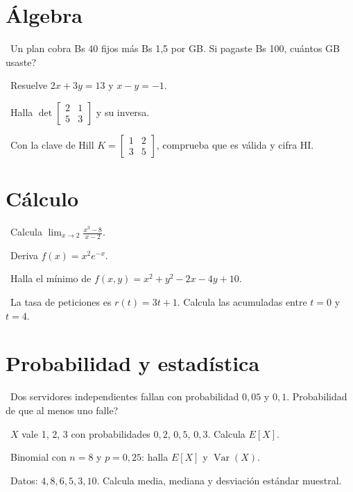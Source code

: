 \section*{\'Algebra}
\begin{tmlista}[start=9]
\item \tmbasico\ Un plan cobra Bs 40 fijos m\'as Bs 1,5 por GB. Si pagaste Bs 100, \textquestiondown cu\'antos GB usaste?
\item \tmmedio\ Resuelve $2x+3y=13$ y $x-y=-1$.
\item \tmmedio\ Halla $\det\begin{bmatrix}2&1\\5&3\end{bmatrix}$ y su inversa.
\item \tmdificil\ Con la clave de Hill $K=\begin{bmatrix}1&2\\3&5\end{bmatrix}$, comprueba que es v\'alida y cifra HI.
\end{tmlista}

\section*{C\'alculo}
\begin{tmlista}[start=13]
\item \tmbasico\ Calcula $\lim_{x\to2}\frac{x^3-8}{x-2}$.
\item \tmmedio\ Deriva $f(x)=x^2e^{-x}$.
\item \tmmedio\ Halla el m\'inimo de $f(x, y)=x^2+y^2-2x-4y+10$.
\item \tmdificil\ La tasa de peticiones es $r(t)=3t+1$. Calcula las acumuladas entre $t=0$ y $t=4$.
\end{tmlista}

\section*{Probabilidad y estad\'istica}
\begin{tmlista}[start=17]
\item \tmbasico\ Dos servidores independientes fallan con probabilidad $0{,}05$ y $0{,}1$. \textquestiondown Probabilidad de que al menos uno falle?
\item \tmmedio\ $X$ vale 1, 2, 3 con probabilidades $0{,}2$, $0{,}5$, $0{,}3$. Calcula $E[X]$.
\item \tmmedio\ Binomial con $n=8$ y $p=0{,}25$: halla $E[X]$ y $\operatorname{Var}(X)$.
\item \tmdificil\ Datos: $4, 8, 6, 5, 3, 10$. Calcula media, mediana y desviaci\'on est\'andar muestral.
\end{tmlista}

